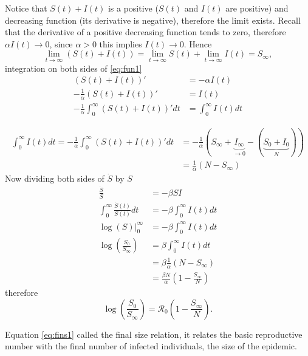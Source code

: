 \documentclass{book}\usepackage[]{graphicx}\usepackage[]{color}
\begin{document}
Notice that $S(t)+I(t)$ is a positive ($S(t)$ and $I(t)$ are positive) and decreasing function (its derivative is negative), therefore the limit exists. Recall that the derivative of a positive decreasing function tends to zero, therefore $\alpha I(t)\rightarrow 0$, since $\alpha>0$ this implies $I(t)\rightarrow 0$. 
%
Hence
$$\lim_{t\rightarrow \infty} (S(t)+I(t))=\lim_{t\rightarrow \infty} S(t)+\lim_{t\rightarrow \infty}I(t)=S_{\infty},$$
%
integration on both sides of \eqref{eq:fun1}
\begin{align*}
(S(t)+I(t))' &= -\alpha I(t)\\
-\frac{1}{\alpha}(S(t)+I(t))' &= I(t)\\
-\frac{1}{\alpha}\int_0^{\infty} (S(t)+I(t))' dt &= \int_0^{\infty} I(t)dt
\end{align*}
%

\begin{align*}
\int_0^{\infty} I(t)dt=-\frac{1}{\alpha}\int_0^{\infty} (S(t)+I(t))' dt &= -\frac{1}{\alpha}(S_\infty+\underbrace{I_\infty}_{\rightarrow 0}-(\underbrace{S _0+I_0}_{N}))\\
&=\frac{1}{\alpha}(N-S_\infty)
\end{align*}
Now dividing  both sides of $\dot{S}$  by $S$
%
\begin{align*}
\frac{\dot{S}}{S}&=-\beta S I\\
\int_0^\infty \frac{\dot{S}(t)}{S(t)} dt&=-\beta \int_0^\infty  I(t)dt\\
\log(S)\Big|_{0}^\infty &= -\beta \int_0^\infty  I(t)dt\\
\log\left( \frac{S_0}{S_\infty}\right)  &= \beta \int_0^\infty  I(t)dt\\
&= \beta\frac{1}{\alpha}(N-S_\infty)\\
&= \frac{\beta N}{\alpha}\left( 1-\frac{S_\infty}{N}\right) 
\end{align*}
therefore
\begin{equation} \label{eq:fins1}
    \log\left( \frac{S_0}{S_\infty}\right)  = \mathcal{R}_0\left( 1-\frac{S_\infty}{N}\right).
\end{equation}

Equation \eqref{eq:fins1} called the final size relation, it relates the basic reproductive number with the final number of infected individuals, the size of the epidemic.
\end{document}
